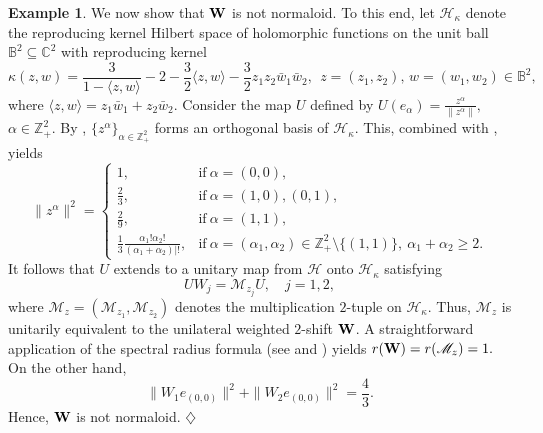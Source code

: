 \documentclass[10pt, a4paper, oneside, reqno]{amsproc}
\numberwithin{equation}{section}
\theoremstyle{remark}
\theoremstyle{definition}
\newtheorem{example}[theorem]{Example}
\newcommand*{\Ge}{\geqslant}
\begin{document}
\begin{example}
We now show that ${\bf W}$ is not normaloid. To this end, let $\mathscr{H}_\kappa$ denote the reproducing kernel Hilbert space of holomorphic functions on the unit ball $\mathbb B^2 \subseteq \mathbb C^2$ with reproducing kernel
\begin{equation*}
\kappa(z,w) = \frac{3}{1-\langle z,w\rangle}- 2-\frac{3}{2}\langle z,w\rangle-\frac{3}{2}z_1z_2\bar{w}_1 \bar{w}_2, ~~ z=(z_1,z_2), \, w=(w_1,w_2) \in \mathbb B^2,
\end{equation*}
where $\langle z,w\rangle = z_1\bar{w}_1 + z_2\bar{w}_2$.
Consider the map $U$ defined by $U(e_{\alpha})=\frac{z^{\alpha}}{\|z^{\alpha}\|},$ $\alpha \in \mathbb Z^2_+$. 
By \cite[Theorem~4.14]{PR2016}, $\{z^{\alpha}\}_{\alpha \in \mathbb Z^2_+}$ forms an orthogonal basis of $\mathscr H_\kappa$. This, combined with \cite[Exercise~3.7 and Proposition 4.11]{PR2016}, yields    
\[\|z^{\alpha}\|^2 = \begin{cases}
1, & \mbox{if}~\alpha=(0,0),\\ 
\frac{2}{3}, & \mbox{if}~\alpha=(1,0),(0,1),\\ 
\frac{2}{9}, & \mbox{if}~\alpha =(1,1),\\
\frac{1}{3} \frac{\alpha_1!\alpha_2!}{(\alpha_1+\alpha_2)|!},& \mbox{if}~\alpha=(\alpha_1, \alpha_2) \in \mathbb Z_+^2 \setminus \{(1,1)\}, 
~\alpha_1+\alpha_2 \Ge 2.
\end{cases}\]
It follows that $U$ extends to a unitary map from $\mathcal H$ onto $\mathscr H_\kappa$ satisfying $$UW_j = \mathscr M_{z_j}U,\quad j=1, 2,$$  
where $\mathscr M_{z} =(\mathscr M_{z_1},\mathscr M_{z_2})$ denotes the multiplication $2$-tuple on $\mathscr{H}_\kappa$.
Thus, $\mathscr M_z$ is unitarily equivalent to the unilateral weighted $2$-shift ${\bf W}$.
A straightforward application of the spectral radius formula (see  \cite[Theorem~1]{CZ1992} and \cite[Theorem~1]{MS1992}) yields $r({\bf W})=r(\mathscr M_z)=1.$ On the other hand, $$\|W_1e_{(0, 0)}\|^2 + \|W_2e_{(0, 0)}\|^2=\frac{4}{3}.$$ Hence, ${\bf W}$ is not normaloid.
\hfill $\diamondsuit$
\end{example}
\end{document}
